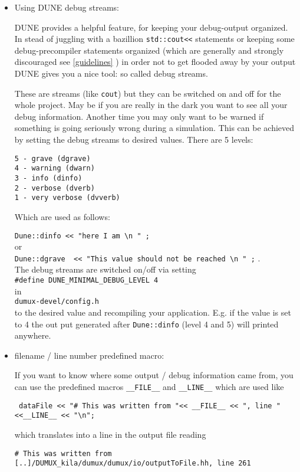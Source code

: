 \begin{itemize}
\item Using DUNE debug streams:

  DUNE provides a helpful feature, for keeping your debug-output organized. 
  In stead of juggling with a bazillion \verb+std::cout<<+ statements or keeping some debug-precompiler statements organized (which are generally and strongly discouraged see \ref{guidelines} ) in order not to get 
  flooded away by your output DUNE gives you a nice tool: so called debug streams. 

  These are streams (like \verb+cout+) but they can be switched on and off for the whole project. 
  May be if you are really in the  dark you want to see all your debug information. Another time you may only want to be warned if something is going seriously wrong during a simulation. 
  This can be achieved by setting the debug streams to desired values. There are 5 levels:
\begin{verbatim}
5 - grave (dgrave)
4 - warning (dwarn)
3 - info (dinfo)
2 - verbose (dverb)
1 - very verbose (dvverb)
\end{verbatim}
Which are used as follows:

\verb+Dune::dinfo << "here I am \n " ;+\\
or \\
\verb+Dune::dgrave  << "This value should not be reached \n " ;+ . \\
The debug streams are switched on/off via  setting  \\
\verb+#define DUNE_MINIMAL_DEBUG_LEVEL 4 + \\ 
in \\
\verb+dumux-devel/config.h+ \\
to the desired value and recompiling your application. E.g. if the value is set to 4 the out put generated after \verb+Dune::dinfo+ (level 4 and 5) will printed anywhere. 

 \item filename / line number predefined macro:

If you want to  know where some output / debug information came from, you can use the predefined macros \verb+__FILE__+ and \verb+__LINE__+ 
which are used like            

\verb+ dataFile << "# This was written from "<< __FILE__ << ", line " <<__LINE__ << "\n";+

which translates into a line in the output file reading 

\verb+# This was written from [..]/DUMUX_kila/dumux/dumux/io/outputToFile.hh, line 261+


\end{itemize}
